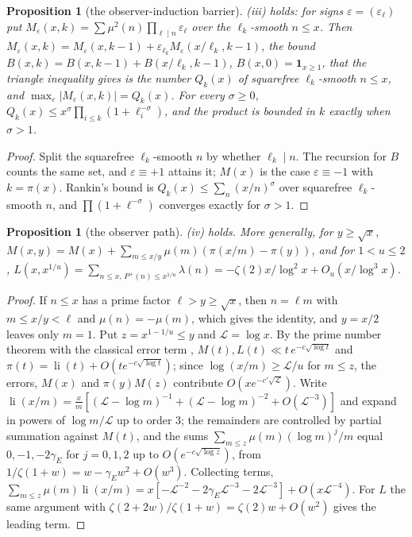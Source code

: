 \documentclass[11pt]{article}
\newtheorem{proposition}[theorem]{Proposition}
\theoremstyle{definition}\newtheorem{definition}[theorem]{Definition}
\theoremstyle{remark}\newtheorem{remark}[theorem]{Remark}
\begin{document}
\begin{proposition}[the observer-induction barrier]\label{prop:barrier}
(iii) holds: for signs $\varepsilon=(\varepsilon_\ell)$ put $M_\varepsilon(x,k)=\sum\mu^2(n)\prod_{\ell\mid n}\varepsilon_\ell$ over the $\ell_k$-smooth $n\le x$. Then $M_\varepsilon(x,k)=M_\varepsilon(x,k-1)+\varepsilon_{\ell_k}M_\varepsilon(x/\ell_k,k-1)$, the bound $B(x,k)=B(x,k-1)+B(x/\ell_k,k-1)$, $B(x,0)=\mathbf 1_{x\ge1}$, that the triangle inequality gives is the number $Q_k(x)$ of squarefree $\ell_k$-smooth $n\le x$, and $\max_\varepsilon|M_\varepsilon(x,k)|=Q_k(x)$. For every $\sigma\ge0$, $Q_k(x)\le x^\sigma\prod_{i\le k}(1+\ell_i^{-\sigma})$, and the product is bounded in $k$ exactly when $\sigma>1$.
\end{proposition}
\begin{proof}
Split the squarefree $\ell_k$-smooth $n$ by whether $\ell_k\mid n$. The recursion for $B$ counts the same set, and $\varepsilon\equiv+1$ attains it; $M(x)$ is the case $\varepsilon\equiv-1$ with $k=\pi(x)$. Rankin's bound is $Q_k(x)\le\sum_n(x/n)^\sigma$ over squarefree $\ell_k$-smooth $n$, and $\prod(1+\ell^{-\sigma})$ converges exactly for $\sigma>1$.
\end{proof}

\begin{proposition}[the observer path]\label{prop:path}
(iv) holds. More generally, for $y\ge\sqrt x$, $M(x,y)=M(x)+\sum_{m\le x/y}\mu(m)(\pi(x/m)-\pi(y))$, and for $1<u\le2$, $L(x,x^{1/u})=\sum_{n\le x,\,P^+(n)\le x^{1/u}}\lambda(n)=-\zeta(2)x/\log^2x+O_u(x/\log^3x)$.
\end{proposition}
\begin{proof}
If $n\le x$ has a prime factor $\ell>y\ge\sqrt x$, then $n=\ell m$ with $m\le x/y<\ell$ and $\mu(n)=-\mu(m)$, which gives the identity, and $y=x/2$ leaves only $m=1$. Put $z=x^{1-1/u}\le y$ and $\mathcal L=\log x$. By the prime number theorem with the classical error term \cite[Ch.~III]{Titchmarsh}, $M(t),L(t)\ll t\,e^{-c\sqrt{\log t}}$ and $\pi(t)=\operatorname{li}(t)+O(te^{-c\sqrt{\log t}})$; since $\log(x/m)\ge\mathcal L/u$ for $m\le z$, the errors, $M(x)$ and $\pi(y)M(z)$ contribute $O(xe^{-c'\sqrt{\mathcal L}})$. Write $\operatorname{li}(x/m)=\frac xm[(\mathcal L-\log m)^{-1}+(\mathcal L-\log m)^{-2}+O(\mathcal L^{-3})]$ and expand in powers of $\log m/\mathcal L$ up to order $3$; the remainders are controlled by partial summation against $M(t)$, and the sums $\sum_{m\le z}\mu(m)(\log m)^j/m$ equal $0,-1,-2\gamma_E$ for $j=0,1,2$ up to $O(e^{-c\sqrt{\log z}})$, from $1/\zeta(1+w)=w-\gamma_Ew^2+O(w^3)$. Collecting terms, $\sum_{m\le z}\mu(m)\operatorname{li}(x/m)=x[-\mathcal L^{-2}-2\gamma_E\mathcal L^{-3}-2\mathcal L^{-3}]+O(x\mathcal L^{-4})$. For $L$ the same argument with $\zeta(2+2w)/\zeta(1+w)=\zeta(2)w+O(w^2)$ gives the leading term.
\end{proof}
\end{document}
